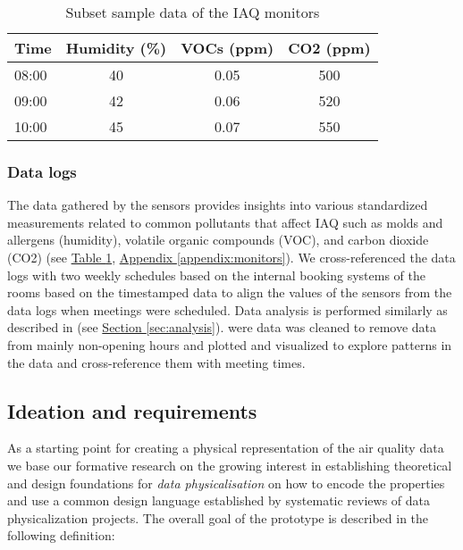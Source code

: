 \begin{table}[htbp]
    \centering
    \caption{Subset sample data of the IAQ monitors}
    \begin{tabular}{lccc}
        \toprule
        \textbf{Time} & \textbf{Humidity (\%)} & \textbf{VOCs (ppm)} & \textbf{CO2 (ppm)} \\
        \midrule
        08:00 & 40 & 0.05 & 500 \\
        09:00 & 42 & 0.06 & 520 \\
        10:00 & 45 & 0.07 & 550 \\
        \bottomrule
    \end{tabular}
    \label{tab:air-quality}
\end{table}

\subsubsection{Data logs}

The data gathered by the sensors provides insights into various standardized measurements related to common pollutants that affect IAQ such as molds and allergens (humidity), volatile organic compounds (VOC), and carbon dioxide (CO2) (see \hyperref[tab:air-quality]{Table \ref*{tab:air-quality}}, \hyperref[appendix:monitors]{Appendix \ref*{appendix:monitors}}). We cross-referenced the data logs with two weekly schedules based on the internal booking systems of the rooms based on the timestamped data to align the values of the sensors from the data logs when meetings were scheduled. Data analysis is performed similarly as described in (see \hyperref[sec:analysis]{Section \ref*{sec:analysis}}). were data was cleaned to remove data from mainly non-opening hours and plotted and visualized to explore patterns in the data and cross-reference them with meeting times.


\subsection{Ideation and requirements}
\label{sec:ideation}

As a starting point for creating a physical representation of the air quality data we base our formative research on the growing interest in establishing theoretical and design foundations for \textit{data physicalisation} \cite{hornecker_design_2023, sauve_physecology_2022, bae_making_2022} on how to encode the properties and use a common design language \cite{ranasinghe_encoding_2023, sosa_data_2018} established by systematic reviews of data physicalization projects. The overall goal of the prototype is described in the following definition:

